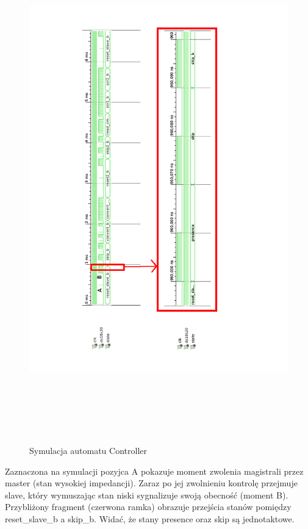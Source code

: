 \documentclass[a4paper]{article}
\begin{document}
\newpage

\begin{figure}[H]
\begin{center}
\includegraphics[height=22cm]{graphics/controller_symulation.png}
\end{center}
\caption{Symulacja automatu Controller}
\label{controller_symulation}
\end{figure}

Zaznaczona na symulacji pozyjca A pokazuje moment zwolenia magistrali przez master (stan wysokiej impedancji). Zaraz po jej zwolnieniu kontrolę przejmuje slave, który wymuszając stan niski sygnalizuje swoją obecność (moment B). Przybliżony fragment (czerwona ramka) obrazuje przejścia stanów pomiędzy reset\_slave\_b a skip\_b. Widać, że stany presence oraz skip są jednotaktowe. 
\end{document}
